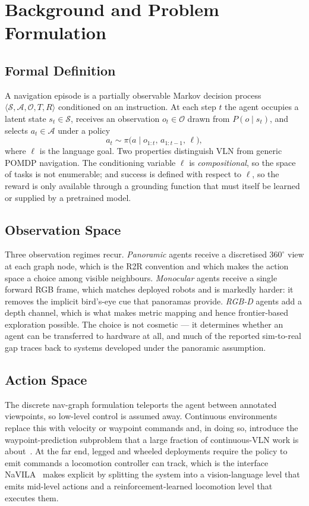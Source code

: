 \documentclass[journal]{IEEEtran}
\begin{document}
\section{Background and Problem Formulation}\label{sec:background}

\subsection{Formal Definition}
A navigation episode is a partially observable Markov decision process
$\langle \mathcal{S}, \mathcal{A}, \mathcal{O}, T, R \rangle$ conditioned on
an instruction. At each step $t$ the agent occupies a latent state
$s_t \in \mathcal{S}$, receives an observation
$o_t \in \mathcal{O}$ drawn from $P(o \mid s_t)$, and selects
$a_t \in \mathcal{A}$ under a policy
\begin{equation}
  a_t \sim \pi\bigl(a \mid o_{1:t},\, a_{1:t-1},\, \ell \bigr),
  \label{eq:policy}
\end{equation}
where $\ell$ is the language goal. Two properties distinguish VLN from
generic POMDP navigation. The conditioning variable $\ell$ is
\emph{compositional}, so the space of tasks is not enumerable; and success
is defined with respect to $\ell$, so the reward is only available through
a grounding function that must itself be learned or supplied by a
pretrained model.

\subsection{Observation Space}
Three observation regimes recur. \emph{Panoramic} agents receive a
discretised $360^\circ$ view at each graph node, which is the R2R
convention and which makes the action space a choice among visible
neighbours. \emph{Monocular} agents receive a single forward RGB frame,
which matches deployed robots and is markedly harder: it removes the
implicit bird's-eye cue that panoramas provide. \emph{RGB-D} agents add a
depth channel, which is what makes metric mapping and hence frontier-based
exploration possible. The choice is not cosmetic --- it determines whether
an agent can be transferred to hardware at all, and much of the reported
sim-to-real gap traces back to systems developed under the panoramic
assumption.

\subsection{Action Space}
The discrete nav-graph formulation teleports the agent between annotated
viewpoints, so low-level control is assumed away. Continuous
environments~\cite{krantz2020beyond} replace this with velocity or waypoint
commands and, in doing so, introduce the waypoint-prediction subproblem
that a large fraction of continuous-VLN work is
about~\cite{an2025etpnav,shi2025smartway,chen2024affordances}. At the far
end, legged and wheeled deployments require the policy to emit commands a
locomotion controller can track, which is the interface
NaVILA~\cite{cheng2024navila} makes explicit by splitting the system into
a vision-language level that emits mid-level actions and a
reinforcement-learned locomotion level that executes them.
\end{document}
